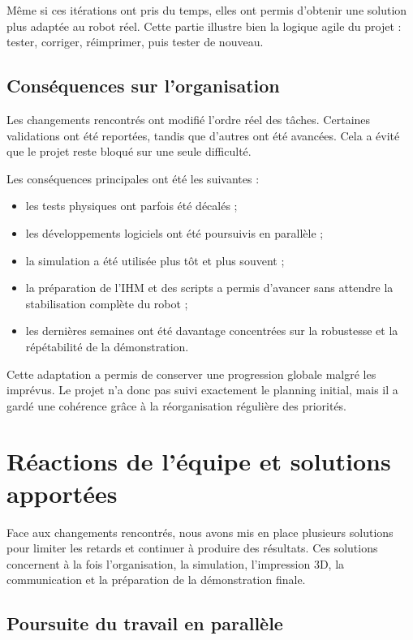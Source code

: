 \documentclass[11pt,a4paper]{report}
\begin{document}
Même si ces itérations ont pris du temps, elles ont permis d'obtenir une solution plus adaptée au robot réel. Cette partie illustre bien la logique agile du projet : tester, corriger, réimprimer, puis tester de nouveau.

\subsection{Conséquences sur l'organisation}

Les changements rencontrés ont modifié l'ordre réel des tâches. Certaines validations ont été reportées, tandis que d'autres ont été avancées. Cela a évité que le projet reste bloqué sur une seule difficulté.

Les conséquences principales ont été les suivantes :
\begin{itemize}
    \item les tests physiques ont parfois été décalés ;
    \item les développements logiciels ont été poursuivis en parallèle ;
    \item la simulation a été utilisée plus tôt et plus souvent ;
    \item la préparation de l'IHM et des scripts a permis d'avancer sans attendre la stabilisation complète du robot ;
    \item les dernières semaines ont été davantage concentrées sur la robustesse et la répétabilité de la démonstration.
\end{itemize}

Cette adaptation a permis de conserver une progression globale malgré les imprévus. Le projet n'a donc pas suivi exactement le planning initial, mais il a gardé une cohérence grâce à la réorganisation régulière des priorités.

\section{Réactions de l'équipe et solutions apportées}

Face aux changements rencontrés, nous avons mis en place plusieurs solutions pour limiter les retards et continuer à produire des résultats. Ces solutions concernent à la fois l'organisation, la simulation, l'impression 3D, la communication et la préparation de la démonstration finale.

\subsection{Poursuite du travail en parallèle}
\end{document}
